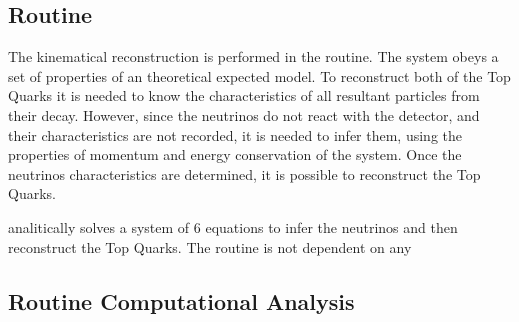 \subsection{\dilep Routine}
\label{Application:dilep}

The kinematical reconstruction is performed in the \dilep routine. The \ttbar system obeys a set of properties of an theoretical expected model. To reconstruct both of the Top Quarks it is needed to know the characteristics of all resultant particles from their decay. However, since the neutrinos do not react with the detector, and their characteristics are not recorded, it is needed to infer them, using the properties of momentum and energy conservation of the system. Once the neutrinos characteristics are determined, it is possible to reconstruct the Top Quarks.

\dilep analitically solves a system of 6 equations to infer the neutrinos and then reconstruct the Top Quarks. The routine is not dependent on any 

\subsection{\ttDilepKinFit Routine Computational Analysis}
\label{Application:ttDilepKinFit:Analysis}

